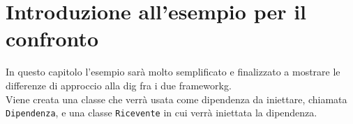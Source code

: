 \section{Introduzione all'esempio per il confronto}
\label{sec:introduzione-esempio-confronto-di}

In questo capitolo l'esempio sarà molto semplificato e finalizzato a mostrare le differenze di approccio alla \gls{dig} fra i due \gls{frameworkg}.\\
Viene creata una classe che verrà usata come dipendenza da iniettare, chiamata \texttt{Dipendenza}, e una classe \texttt{Ricevente} in cui verrà iniettata la dipendenza.